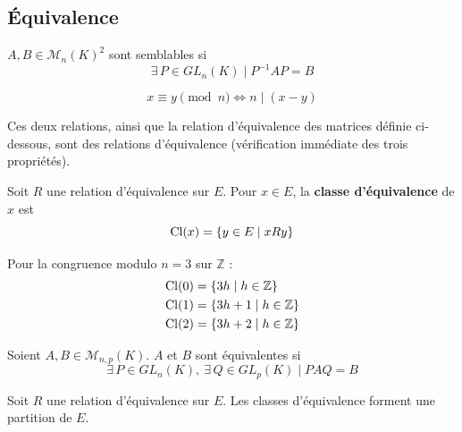 \subsection{Équivalence}

\begin{defi}
$A, B \in \mathcal{M}_n(K)^2$ sont semblables si
\[\exists\, P \in GL_n(K) \mid P^{-1}AP = B\]
\end{defi}

\begin{defi}
\[x \equiv y \pmod{n} \iff n \mid (x-y)\]
\end{defi}

Ces deux relations, ainsi que la relation d'équivalence des matrices définie ci-dessous, sont des relations d'équivalence (vérification immédiate des trois propriétés).

\begin{defi}
Soit $R$ une relation d'équivalence sur $E$. Pour $x\in E$, la \textbf{classe d'équivalence} de $x$ est
\[\operatorname{Cl}(x) = \{y \in E \mid xRy\}\]
\end{defi}

\begin{exemple}
Pour la congruence modulo $n = 3$ sur $\mathbb{Z}$ :
\begin{align*}
\operatorname{Cl}(0) &= \{3h \mid h \in \mathbb{Z}\} \\
\operatorname{Cl}(1) &= \{3h+1 \mid h \in \mathbb{Z}\} \\
\operatorname{Cl}(2) &= \{3h+2 \mid h \in \mathbb{Z}\}
\end{align*}
\end{exemple}

\begin{defi}
Soient $A, B \in \mathcal{M}_{n,p}(K)$. $A$ et $B$ sont équivalentes si
\[\exists\, P \in GL_n(K),\ \exists\, Q \in GL_p(K) \mid PAQ = B\]
\end{defi}

\begin{prop}
\label{prop:classes-partition}
Soit $R$ une relation d'équivalence sur $E$. Les classes d'équivalence
forment une partition de $E$.
\end{prop}

